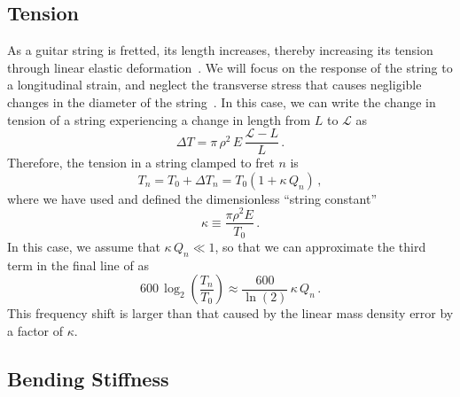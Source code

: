  \subsection{Tension\label{sct:model_tension}}
As a guitar string is fretted, its length increases, thereby increasing its tension through linear elastic deformation~\cite{ref:landau1986toe}. We will focus on the response of the string to a longitudinal strain, and neglect the transverse stress that causes negligible changes in the diameter of the string~\cite{ref:lynchaird2017mpn}. In this case, we can write the change in tension of a string experiencing a change in length from $L$ to $\mathcal{L}$ as
 \begin{equation} \label{eqn:youngs_mod_def}
\Delta T = \pi\, \rho^2\, E\, \frac{\mathcal{L} - L}{L}\, .
 \end{equation}
Therefore, the tension in a string clamped to fret $n$ is
 \begin{equation}
T_n = T_0 + \Delta T_n = T_0 \left( 1 + \kappa\, Q_n \right)\, ,
 \end{equation}
where we have used  and defined the dimensionless ``string constant''
 \begin{equation}\label{eqn:kappa_def}
\kappa \equiv \frac{\pi \rho^2 E}{T_0}\, .
 \end{equation}
In this case, we assume that $\kappa\, Q_n \ll 1$, so that we can approximate the third term in the final line of  as
 \begin{equation} \label{eqn:tension_shift}
600\, \log_2 \left(  \frac{T_n}{T_0} \right) \approx \frac{600}{\ln(2)}\, \kappa\, Q_n\, .
 \end{equation}
This frequency shift is larger than that caused by the linear mass density error by a factor of $\kappa$.

 \subsection{Bending Stiffness}

